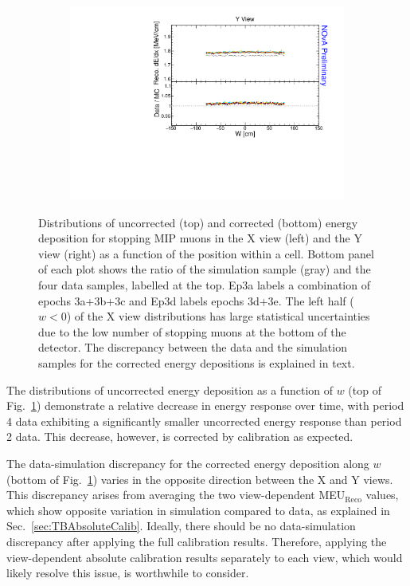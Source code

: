\begin{figure}[!ht]
\begin{subfigure}{0.495\textwidth}
  \end{subfigure}
  \begin{subfigure}{0.495\textwidth}
    \includegraphics[width=\linewidth]{Plots/Calibana/recomevcm_w_y.pdf}
  \end{subfigure}
  \caption[Validation plots for stopping muons along w]{Distributions of uncorrected (top) and corrected (bottom) energy deposition for stopping \acrshort{MIP} muons in the X view (left) and the Y view (right) as a function of the position within a cell. Bottom panel of each plot shows the ratio of the simulation sample (gray) and the four data samples, labelled at the top. Ep3a labels a combination of epochs 3a+3b+3c and Ep3d labels epochs 3d+3e. The left half ($w<0$) of the X view distributions has large statistical uncertainties due to the low number of stopping muons at the bottom of the detector. The discrepancy between the data and the simulation samples for the corrected energy depositions is explained in text.}
  \label{fig:AbsCalibW1}
\end{figure}

The distributions of uncorrected energy deposition as a function of $w$ (top of Fig.~\ref{fig:AbsCalibW1}) demonstrate a relative decrease in energy response over time, with period 4 data exhibiting a significantly smaller uncorrected energy response than period 2 data. This decrease, however, is corrected by calibration as expected.

The data-simulation discrepancy for the corrected energy deposition along $w$ (bottom of Fig.~\ref{fig:AbsCalibW1}) varies in the opposite direction between the X and Y views. This discrepancy arises from averaging the two view-dependent \gls{MEU}$_{\mathrm{Reco}}$ values, which show opposite variation in simulation compared to data, as explained in Sec.~\ref{sec:TBAbsoluteCalib}. Ideally, there should be no data-simulation discrepancy after applying the full calibration results. Therefore, applying the view-dependent absolute calibration results separately to each view, which would likely resolve this issue, is worthwhile to consider.

